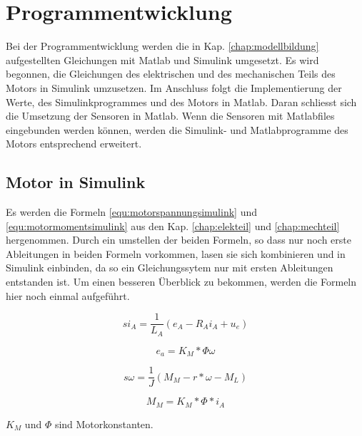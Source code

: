 \newpage




\chapter{Programmentwicklung}
\label{chap:Programmentwicklung}
Bei der Programmentwicklung werden die in Kap. \ref{chap:modellbildung} aufgestellten Gleichungen mit Matlab und Simulink umgesetzt.
Es wird begonnen, die Gleichungen des elektrischen und des mechanischen Teils des Motors in Simulink umzusetzen.
Im Anschluss folgt die Implementierung der Werte, des Simulinkprogrammes und des Motors in Matlab.
Daran schliesst sich die Umsetzung der Sensoren in Matlab.
Wenn die Sensoren mit Matlabfiles eingebunden werden können, werden die Simulink- und Matlabprogramme des Motors entsprechend erweitert.

\section{Motor in Simulink}
\label{chap:motorinsimulink}
Es werden die Formeln \ref{equ:motorspannungsimulink} und \ref{equ:motormomentsimulink} aus den Kap. \ref{chap:elekteil} und \ref{chap:mechteil} hergenommen.
Durch ein umstellen der beiden Formeln, so dass nur noch erste Ableitungen in beiden Formeln vorkommen, lasen sie sich kombinieren und in Simulink einbinden, da so ein
Gleichungssytem nur mit ersten Ableitungen entstanden ist.
Um einen besseren Überblick zu bekommen, werden die Formeln hier noch einmal aufgeführt.
\begin{center}
\begin{equation}
\label{equ:motorspannungsimulink2}
si_A = \frac{1}{L_A} (e_A - R_Ai_A + u_e)
\end{equation}
\end{center}
\begin{center}
\begin{equation}
\label{equ:motorspannungsimulinkkonst2}
e_a = K_M * \Phi \omega
\end{equation}
\end{center}
\begin{center}
\begin{equation}
\label{equ:motormomentsimulink2}
s\omega = \frac{1}{J} (M_M - r * \omega - M_L)
\end{equation}
\end{center}
\begin{center}
\begin{equation}
\label{equ:motormomentsimulinkkonst2}
M_M = K_M * \Phi *i_A
\end{equation}
\end{center}
$K_M$ und $\Phi$ sind Motorkonstanten.

